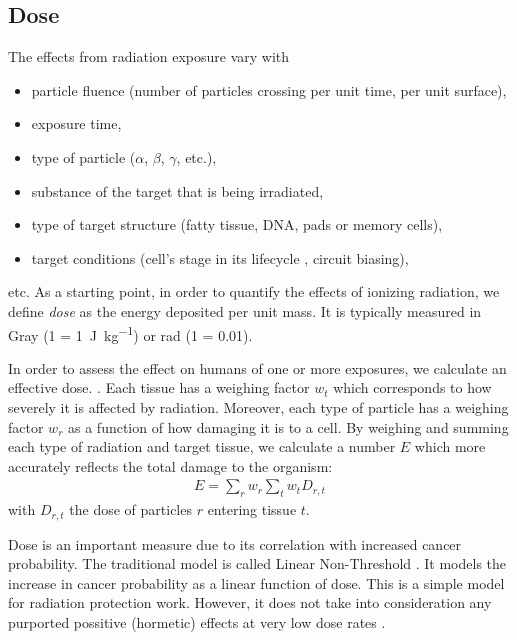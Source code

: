 \subsection{Dose}
The effects from radiation exposure vary with
\begin{itemize}
    \item particle fluence
        (number of particles crossing per unit time, per unit surface),
    \item exposure time,
    \item type of particle ($\alpha$, $\beta$, $\gamma$, etc.),
    \item substance of the target that is being irradiated,
    \item type of target structure (fatty tissue, DNA, pads or memory cells),
    \item target conditions (cell's stage in its lifecycle
        \cite{podgorsak_radiation_2005}, circuit biasing),
\end{itemize}etc.
As a starting point, in order to quantify the effects of ionizing radiation,
we define \emph{dose} as the energy deposited per unit mass.
It is typically measured in Gray 
(\SI{1}{\Gray} = \SI{1}{\joule\per\kilo\gram}) 
or rad
(\SI{1}{\rad} = \SI{0.01}{\Gray}).

In order to assess the effect on humans of one or more exposures,
we calculate an effective dose.
\cite{martin_effective_2007}.
Each tissue has a weighing factor $w_t$ which corresponds to how severely it is affected by radiation.
Moreover, each type of particle has a weighing factor $w_r$
as a function of how damaging it is to a cell.
By weighing and summing each type of radiation and target tissue,
we calculate a number $E$ which more accurately reflects the total damage to the organism:
\begin{align*}
    E = \sum_r w_r \sum_t w_t D_{r,t}
\end{align*}
with $D_{r,t}$ the dose of particles $r$ entering tissue $t$.

Dose is an important measure due to its correlation with increased cancer probability.
The traditional model is called Linear Non-Threshold
\cite{valentin_low-dose_2006}.
It models the increase in cancer probability as a linear function of dose.
This is a simple model for radiation protection work.
However, it does not take into consideration any purported possitive (hormetic)
effects at very low dose rates
\cite{hooker_linear_2004}.
